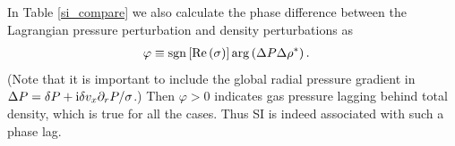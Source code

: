

In Table \ref{si_compare} we also calculate the phase difference
between the Lagrangian pressure perturbation and density perturbations
as    
\begin{align*} 
\varphi&\equiv \operatorname{sgn}{\left[\operatorname{Re}{(\sigma)}\right]}\arg\left(\Delta
  P\Delta\rho^*\right).\notag 
\end{align*}
(Note that it is important to include 
the global radial pressure gradient in $\Delta P = \delta P + \mathrm{i} \delta v_x \partial_rP/\sigma$.) Then 
$\varphi > 0 $ indicates gas pressure lagging behind total density, 
which is true for all the cases. Thus SI is indeed associated with
such a phase lag.






